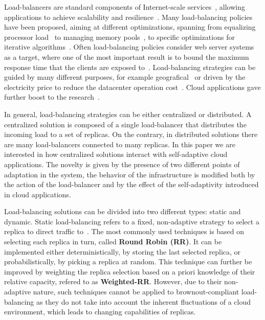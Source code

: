 Load-balancers are standard components of Internet-scale
services~\cite{WangOSDI}, allowing applications to achieve scalability
and resilience~\citep{Barroso09, Hamilton07:LISA,
  clusteredbalancing}. Many load-balancing policies have been
proposed, aiming at different optimizations, spanning from equalizing
processor load~\cite{Stankovic:TC} to managing memory
pools~\cite{PattersonMemoryLB,MemoryLBACC}, to specific optimizations
for iterative algorithms~\cite{BahiIterative}. Often load-balancing
policies consider web server systems~\cite{CLB,Cardellini2003} as a
target, where one of the most important result is to bound the maximum
response time that the clients are exposed
to~\cite{TC-Abdelzaher}. Load-balancing strategies can be guided by
many different purposes, for example
geografical~\cite{GeograficalSASO,geographicalwanbalancing} or driven
by the electricity price to reduce the datacenter operation
cost~\cite{LoadBalancingForElectricity:TCC}. Cloud applications gave
further boost to the
research~\citep{Barroso09,Lu11:PerfEval,Lin12:IGCC}.

In general, load-balancing strategies can be either centralized or
distributed. A centralized solution is composed of a single
load-balancer that distributes the incoming load to a set of
replicas. On the contrary, in distributed solutions there are many
load-balancers connected to many replicas. In this paper we are
interested in how centralized solutions interact with self-adaptive
cloud applications. The novelty is given by the presence of two
different points of adaptation in the system, the behavior of the
infrastructure is modified both by the action of the load-balancer and
by the effect of the self-adaptivity introduced in cloud applications.

Load-balancing solutions can be divided into two different types:
static and dynamic. Static load-balancing refers to a fixed,
non-adaptive strategy to select a replica to direct traffic
to~\cite{StaticLoadBalancing:TSE,StaticOptimal:ACM}.  The most
commonly used techniques is based on selecting each replica in turn,
called \textbf{Round Robin (RR)}. It can be implemented either
deterministically, by storing the last selected replica, or
probabilistically, by picking a replica at random.  This technique can
further be improved by weighting the replica selection based on a
priori knowledge of their relative capacity, refered to as
\textbf{Weighted-RR}.  However, due to their non-adaptive nature, such
techniques cannot be applied to brownout-compliant load-balancing as
they do not take into account the inherent fluctuations of a cloud
environment, which leads to changing capabilities of replicas.

